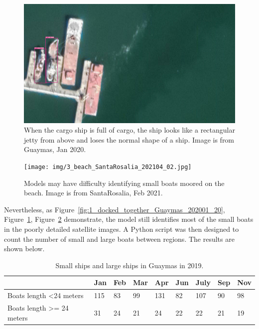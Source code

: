 \begin{figure}[h!]
    \centering
    \includegraphics[scale=0.105]{img/2_square_Guaymas_202001_01.jpg}
    \caption{When the cargo ship is full of cargo, the ship looks like a rectangular jetty from above and loses the normal shape of a ship. Image is from Guaymas, Jan 2020.}
    \label{fig:2_square_Guaymas_202001_01}
\end{figure}

\begin{figure}[h!]
    \centering
    \texttt{[image: img/3\_beach\_SantaRosalia\_202104\_02.jpg]}
    \caption{Models may have difficulty identifying small boats moored on the beach. Image is from SantaRosalia, Feb 2021.}
    \label{fig:3_beach_SantaRosalia_202104_02}
\end{figure}

Nevertheless, as Figure~\ref{fig:1_docked_together_Guaymas_202001_20}, Figure~\ref{fig:2_square_Guaymas_202001_01}, Figure~\ref{fig:3_beach_SantaRosalia_202104_02} demonstrate, the model still identifies most of the small boats in the poorly detailed satellite images. A Python script was then designed to count the number of small and large boats between regions. The results are shown below.


\begin{table}[h!]
\begin{tabular}{|l|l|l|l|l|l|l|l|l|}
\hline
                                       & Jan & Feb & Mar & Apr & Jun & July & Sep & Nov \\ \hline
Boats length \textless 24 meters       & 115 & 83  & 99  & 131 & 82  & 107  & 90  & 98  \\ \hline
Boats length \textgreater{}= 24 meters & 31  & 24  & 21  & 24  & 22  & 22   & 21  & 19  \\ \hline
\end{tabular}
\caption{Small ships and large ships in Guaymas in 2019.}
\end{table}





